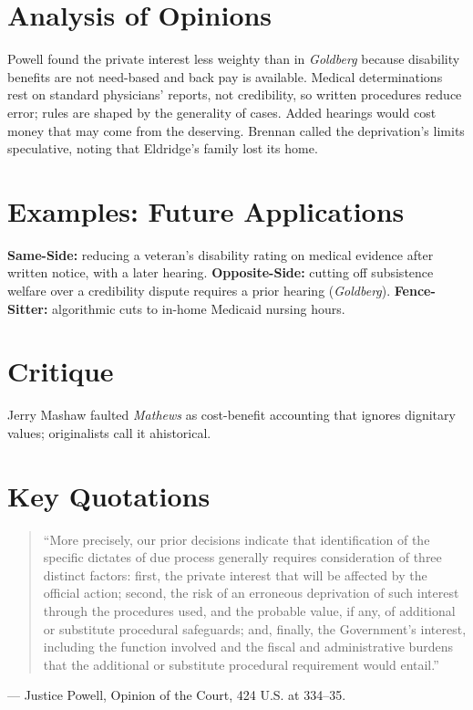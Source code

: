 \documentclass[12pt]{article}
\begin{document}
\section{Analysis of Opinions}
Powell found the private interest less weighty than in \textit{Goldberg} because disability benefits are not need-based and back pay is available. Medical determinations rest on standard physicians' reports, not credibility, so written procedures reduce error; rules are shaped by the generality of cases. Added hearings would cost money that may come from the deserving. Brennan called the deprivation's limits speculative, noting that Eldridge's family lost its home.

\section{Examples: Future Applications}
\textbf{Same-Side:} reducing a veteran's disability rating on medical evidence after written notice, with a later hearing. \textbf{Opposite-Side:} cutting off subsistence welfare over a credibility dispute requires a prior hearing (\textit{Goldberg}). \textbf{Fence-Sitter:} algorithmic cuts to in-home Medicaid nursing hours.

\section{Critique}
Jerry Mashaw faulted \textit{Mathews} as cost-benefit accounting that ignores dignitary values; originalists call it ahistorical.

\section{Key Quotations}
\begin{quote}
``More precisely, our prior decisions indicate that identification of the specific dictates of due process generally requires consideration of three distinct factors: first, the private interest that will be affected by the official action; second, the risk of an erroneous deprivation of such interest through the procedures used, and the probable value, if any, of additional or substitute procedural safeguards; and, finally, the Government's interest, including the function involved and the fiscal and administrative burdens that the additional or substitute procedural requirement would entail.''
\end{quote}
\noindent --- Justice Powell, Opinion of the Court, 424 U.S. at 334--35.
\end{document}
